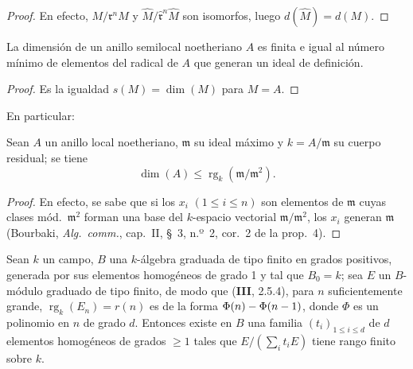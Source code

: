 
\begin{proof}
En efecto, $M/\mathfrak{r}^nM$ y
$\widehat{M}/\widehat{\mathfrak{r}}^n\widehat{M}$ son isomorfos, luego
$d(\widehat{M})=d(M)$.
\end{proof}

\begin{corollary}[16.2.5]
\label{0.16.2.5-fr}
La dimensión de un anillo semilocal noetheriano $A$ es finita e igual al número
mínimo de elementos del radical de $A$ que generan un ideal de definición.
\end{corollary}

\begin{proof}
Es la igualdad $s(M)=\dim(M)$ para $M=A$.
\end{proof}

En particular:

\begin{corollary}[16.2.6]
\label{0.16.2.6-fr}
Sean $A$ un anillo local noetheriano, $\mathfrak{m}$ su ideal máximo y
$k=A/\mathfrak{m}$ su cuerpo residual; se tiene
\begin{equation}
\label{0.16.2.6.1-fr}
\tag{16.2.6.1}
  \dim(A)\leq\operatorname{rg}_k(\mathfrak{m}/\mathfrak{m}^2).
\end{equation}
\end{corollary}

\begin{proof}
En efecto, se sabe que si los $x_i$ $(1\leq i\leq n)$ son elementos de
$\mathfrak{m}$ cuyas clases mód.~$\mathfrak{m}^2$ forman una base del
$k$-espacio vectorial $\mathfrak{m}/\mathfrak{m}^2$, los $x_i$ generan
$\mathfrak{m}$ (Bourbaki, \emph{Alg.~comm.}, cap.~II, \S~3, n.º~2, cor.~2 de
la prop.~4).
\end{proof}

\begin{proposition}[16.2.7]
\label{0.16.2.7-fr}
Sean $k$ un campo, $B$ una $k$-álgebra graduada de tipo finito en grados
positivos, generada por sus elementos homogéneos de grado 1 y tal que $B_0=k$;
sea $E$ un $B$-módulo graduado de tipo finito, de modo que \textup{(\textbf{III}, 2.5.4)}, para
$n$ suficientemente grande, $\operatorname{rg}_k(E_n)=r(n)$ es de la forma
$\Phi(n)-\Phi(n- 1)$, donde $\Phi$ es un polinomio en $n$ de grado $d$. Entonces
existe en $B$ una familia $(t_i)_{1\leq i\leq d}$ de $d$ elementos homogéneos
de grados $\geq1$ tales que $E/(\sum_i t_iE)$ tiene rango finito sobre $k$.
\end{proposition}

